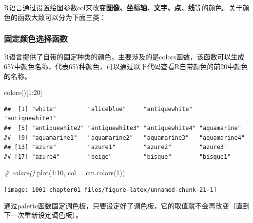 \documentclass[
]{book}
\newenvironment{Shaded}{\begin{snugshade}}{\end{snugshade}}
\newcommand{\AttributeTok}[1]{\textcolor[rgb]{0.77,0.63,0.00}{#1}}
\newcommand{\CommentTok}[1]{\textcolor[rgb]{0.56,0.35,0.01}{\textit{#1}}}
\newcommand{\DecValTok}[1]{\textcolor[rgb]{0.00,0.00,0.81}{#1}}
\newcommand{\FunctionTok}[1]{\textcolor[rgb]{0.00,0.00,0.00}{#1}}
\newcommand{\NormalTok}[1]{#1}
\newcommand{\SpecialCharTok}[1]{\textcolor[rgb]{0.00,0.00,0.00}{#1}}
\begin{document}
R语言通过设置绘图参数col来改变\textbf{图像、坐标轴、文字、点、线}等的颜色。关于颜色的函数大致可以分为下面三类：

\hypertarget{ux56faux5b9aux989cux8272ux9009ux62e9ux51fdux6570}{%
\subsubsection{固定颜色选择函数}\label{ux56faux5b9aux989cux8272ux9009ux62e9ux51fdux6570}}

R语言提供了自带的固定种类的颜色，主要涉及的是colors函数，该函数可以生成657中颜色名称，代表657种颜色，可以通过以下代码查看R自带颜色的前20中颜色的名称。

\begin{Shaded}
\begin{Highlighting}[]
\FunctionTok{colors}\NormalTok{()[}\DecValTok{1}\SpecialCharTok{:}\DecValTok{20}\NormalTok{]}
\end{Highlighting}
\end{Shaded}

\begin{verbatim}
##  [1] "white"         "aliceblue"     "antiquewhite"  "antiquewhite1"
##  [5] "antiquewhite2" "antiquewhite3" "antiquewhite4" "aquamarine"   
##  [9] "aquamarine1"   "aquamarine2"   "aquamarine3"   "aquamarine4"  
## [13] "azure"         "azure1"        "azure2"        "azure3"       
## [17] "azure4"        "beige"         "bisque"        "bisque1"
\end{verbatim}

\begin{Shaded}
\begin{Highlighting}[]
\CommentTok{\# colors()}
\FunctionTok{plot}\NormalTok{(}\DecValTok{1}\SpecialCharTok{:}\DecValTok{10}\NormalTok{, }\AttributeTok{col =} \FunctionTok{cm.colors}\NormalTok{(}\DecValTok{1}\NormalTok{))}
\end{Highlighting}
\end{Shaded}

\begin{center}\texttt{[image: 1001-chapter01\_files/figure-latex/unnamed-chunk-21-1]} \end{center}

通过palette函数固定调色板，只要设定好了调色板，它的取值就不会再改变（直到下一次重新设定调色板）。
\end{document}
